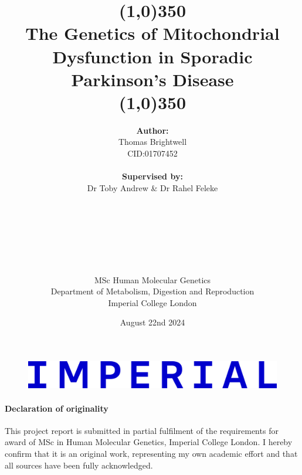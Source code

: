 \documentclass{article}
\title{\textbf{\line(1,0){350}
\\\huge{The Genetics of Mitochondrial Dysfunction in Sporadic Parkinson's Disease}
\\
\line(1,0){350}}}
\author{\textbf{Author:}
\\Thomas Brightwell
\\CID:01707452
\\
\\\textbf{Supervised by:}
\\Dr Toby Andrew & Dr Rahel Feleke
\\
\\
\\
\\
\\
\\
\\
\\MSc Human Molecular Genetics
\\Department of Metabolism, Digestion and Reproduction
\\Imperial College London
}
\date{August 22nd 2024}
\begin{document}
\begin{figure}
    \includegraphics[width=0.5\linewidth]{Thesis/thesis images/IMPERIAL_logo_RGB_Blue_2024.png}
\end{figure}
\maketitle
\newpage
\paragraph{Declaration of originality}
This project report is submitted in partial fulfilment of the requirements for award of MSc in Human Molecular Genetics, Imperial College London. I hereby confirm that it is an original work, representing my own academic effort and that all sources have been fully acknowledged.
\end{document}
